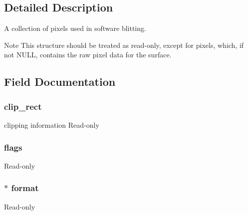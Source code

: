 \subsection{Detailed Description}
A collection of pixels used in software blitting. 

\begin{DoxyNote}{Note}
This structure should be treated as read-\/only, except for {\ttfamily pixels}, which, if not N\+U\+LL, contains the raw pixel data for the surface. 
\end{DoxyNote}


\subsection{Field Documentation}
\subsubsection[{\texorpdfstring{clip\+\_\+rect}{clip_rect}}]{ clip\+\_\+rect}\hypertarget{struct_s_d_l___surface_ada87d50bed22f849936519c4912a5a98}{}\label{struct_s_d_l___surface_ada87d50bed22f849936519c4912a5a98}
clipping information Read-\/only 
\subsubsection[{\texorpdfstring{flags}{flags}}]{ flags}\hypertarget{struct_s_d_l___surface_a048097c5cc2146ce1ff2450684f1b51c}{}\label{struct_s_d_l___surface_a048097c5cc2146ce1ff2450684f1b51c}
Read-\/only 
\subsubsection[{\texorpdfstring{format}{format}}]{$\ast$ format}\hypertarget{struct_s_d_l___surface_a9d191a5bbd871cd7b4ded2158b4f61e8}{}\label{struct_s_d_l___surface_a9d191a5bbd871cd7b4ded2158b4f61e8}
Read-\/only 
